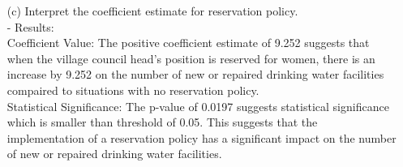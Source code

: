 \documentclass[12pt,letterpaper]{article}
\begin{document}
\begin{enumerate}
	\item [(c)] Interpret the coefficient estimate for reservation policy. 
	\noindent\\
    - Results:\\
    Coefficient Value: 
    The positive coefficient estimate of 9.252 suggests that when the village council head's position is reserved for women, there is an increase by 9.252 on the number of new or repaired drinking water facilities compaired to situations with no reservation policy.\\
    
    Statistical Significance: The p-value of 0.0197 suggests statistical significance which is smaller than threshold of 0.05. This suggests that the implementation of a reservation policy has a significant impact on the number of new or repaired drinking water facilities.
\end{enumerate}
\end{document}
